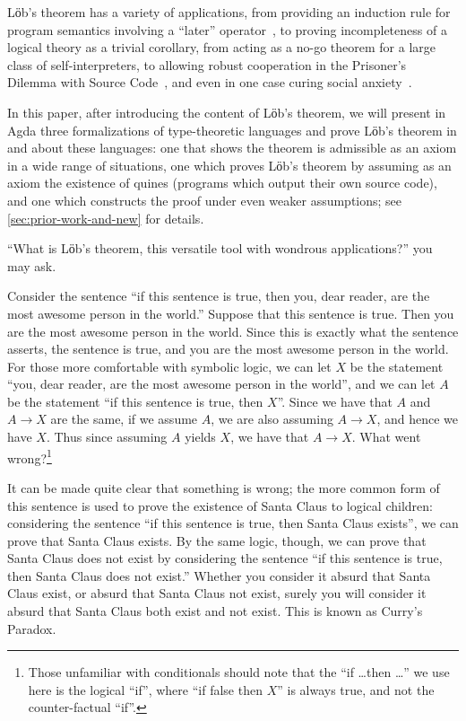  Lӧb's theorem has a variety of applications, from providing an
 induction rule for program semantics involving a ``later''
 operator~\cite{appel2007very}, to proving incompleteness of a logical
 theory as a trivial corollary, from acting as a no-go theorem for a
 large class of self-interpreters, to allowing robust cooperation in
 the Prisoner's Dilemma with Source
 Code~\cite{BaraszChristianoFallensteinEtAl2014}, and even in one case
 curing social anxiety~\cite{Yudkowsky2014}.

 In this paper, after introducing the content of Lӧb's theorem, we
 will present in Agda three formalizations of type-theoretic languages
 and prove Lӧb's theorem in and about these languages: one that shows
 the theorem is admissible as an axiom in a wide range of situations,
 one which proves Lӧb's theorem by assuming as an axiom the existence
 of quines (programs which output their own source code), and one
 which constructs the proof under even weaker assumptions; see
 \autoref{sec:prior-work-and-new} for details.

 ``What is Lӧb's theorem, this versatile tool with wondrous
 applications?'' you may ask.

 Consider the sentence ``if this sentence is true, then you, dear
 reader, are the most awesome person in the world.''  Suppose that
 this sentence is true.  Then you are the most awesome person in the
 world.  Since this is exactly what the sentence asserts, the sentence
 is true, and you are the most awesome person in the world.  For those
 more comfortable with symbolic logic, we can let $X$ be the statement
 ``you, dear reader, are the most awesome person in the world'', and
 we can let $A$ be the statement ``if this sentence is true, then
 $X$''.  Since we have that $A$ and $A → X$ are the same, if we assume
 $A$, we are also assuming $A → X$, and hence we have $X$.  Thus since
 assuming $A$ yields $X$, we have that $A → X$.  What went
 wrong?\footnote{Those unfamiliar with conditionals should note that
 the ``if \ldots\space then \ldots'' we use here is the logical
 ``if'', where ``if false then $X$'' is always true, and not the
 counter-factual ``if''.}

 It can be made quite clear that something is wrong; the more common
 form of this sentence is used to prove the existence of Santa Claus
 to logical children: considering the sentence ``if this sentence is
 true, then Santa Claus exists'', we can prove that Santa Claus
 exists.  By the same logic, though, we can prove that Santa Claus
 does not exist by considering the sentence ``if this sentence is
 true, then Santa Claus does not exist.''  Whether you consider it
 absurd that Santa Claus exist, or absurd that Santa Claus not exist,
 surely you will consider it absurd that Santa Claus both exist and
 not exist.  This is known as Curry's Paradox.

